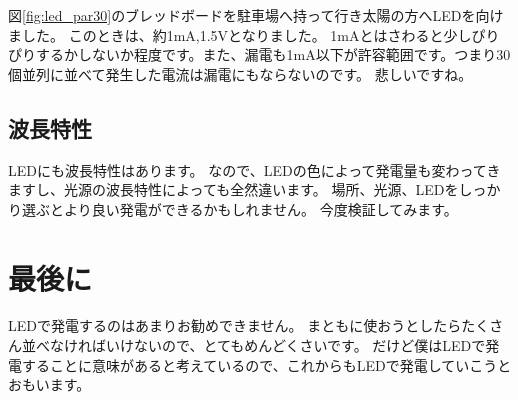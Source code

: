 \newpage
図\ref{fig:led_par30}のブレッドボードを駐車場へ持って行き太陽の方へLEDを向けました。
このときは、約1\si{\milli\ampere},1.5$\si\volt$となりました。
1\si{\milli\ampere}とはさわると少しぴりぴりするかしないか程度です。また、漏電も1\si{\milli\ampere}以下が許容範囲です。つまり30個並列に並べて発生した電流は漏電にもならないのです。
悲しいですね。


\subsection{波長特性}
LEDにも波長特性はあります。
なので、LEDの色によって発電量も変わってきますし、光源の波長特性によっても全然違います。
場所、光源、LEDをしっかり選ぶとより良い発電ができるかもしれません。
今度検証してみます。

\section{最後に}
LEDで発電するのはあまりお勧めできません。
まともに使おうとしたらたくさん並べなければいけないので、とてもめんどくさいです。
だけど僕はLEDで発電することに意味があると考えているので、これからもLEDで発電していこうとおもいます。
